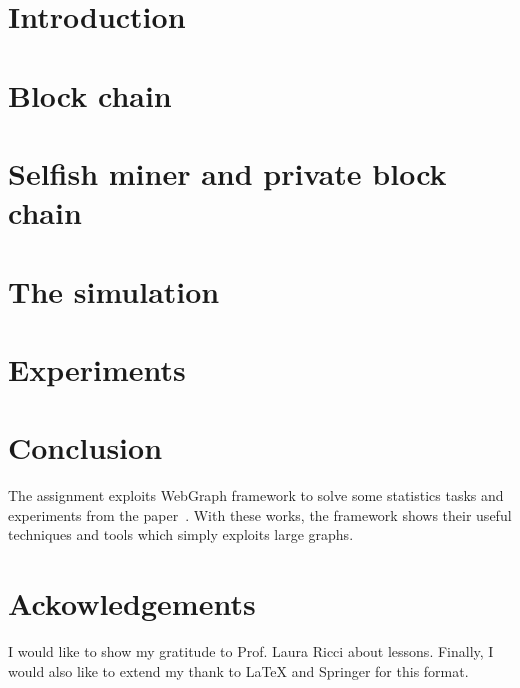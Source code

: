 \documentclass[runningheads,a4paper]{llncs}
\begin{document}
\mainmatter  


\newpage
\tableofcontents
\newpage


\section{Introduction}
\label{Intro}

	
\section{Block chain}
\label{BC}

\section{Selfish miner and private block chain}
\label{CA}





\section{The simulation}
\label{TS}



\section{Experiments}
\label{Exper}

\section{Conclusion}
\label{Con}
The assignment exploits WebGraph framework to solve some statistics tasks and experiments from the paper~\cite{broder2000graph}. With these works, the framework shows their useful techniques and tools which simply exploits large graphs.

\section{Ackowledgements}
I would like to show my gratitude to Prof. Laura Ricci about lessons.
Finally, I would also like to extend my thank to \LaTeX $ $ and Springer for this format.



\end{document}
